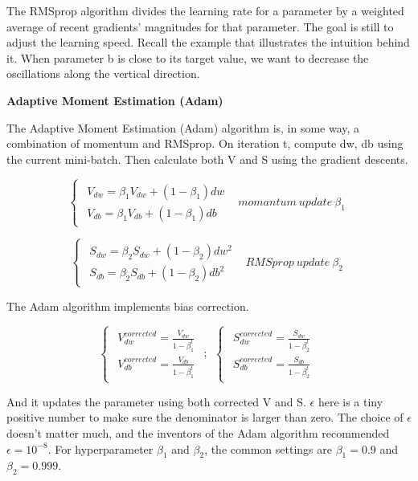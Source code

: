\documentclass[
  12pt,
]{krantz}
\begin{document}
The RMSprop algorithm divides the learning rate for a parameter by a weighted average of recent gradients' magnitudes for that parameter. The goal is still to adjust the learning speed. Recall the example that illustrates the intuition behind it. When parameter b is close to its target value, we want to decrease the oscillations along the vertical direction.

\textbf{Adaptive Moment Estimation (Adam)}

The Adaptive Moment Estimation (Adam) algorithm is, in some way, a combination of momentum and RMSprop. On iteration t, compute dw, db using the current mini-batch. Then calculate both V and S using the gradient descents.

\[\begin{cases} \begin{array}{c} V_{dw}=\beta_{1}V_{dw}+(1-\beta_{1})dw\\ V_{db}=\beta_{1}V_{db}+(1-\beta_{1})db \end{array} & momantum\ update\ \beta_{1}\end{cases}\]

\[\begin{cases} \begin{array}{c} S_{dw}=\beta_{2}S_{dw}+(1-\beta_{2})dw^{2}\\ S_{db}=\beta_{2}S_{db}+(1-\beta_{2})db^{2} \end{array} & RMSprop\ update\ \beta_{2}\end{cases}\]

The Adam algorithm implements bias correction.

\[\begin{cases} \begin{array}{c} V_{dw}^{corrected}=\frac{V_{dw}}{1-\beta_{1}^{t}}\\ V_{db}^{corrected}=\frac{V_{db}}{1-\beta_{1}^{t}} \end{array}\end{cases};\ \ \begin{cases} \begin{array}{c} S_{dw}^{corrected}=\frac{S_{dw}}{1-\beta_{2}^{t}}\\ S_{db}^{corrected}=\frac{S_{db}}{1-\beta_{2}^{t}} \end{array}\end{cases}\]

And it updates the parameter using both corrected V and S. \(\epsilon\) here is a tiny positive number to make sure the denominator is larger than zero. The choice of \(\epsilon\) doesn't matter much, and the inventors of the Adam algorithm recommended \(\epsilon = 10^{-8}\). For hyperparameter \(\beta_1\) and \(\beta_2\), the common settings are \(\beta_1 = 0.9\) and \(\beta_2 = 0.999\).
\end{document}
